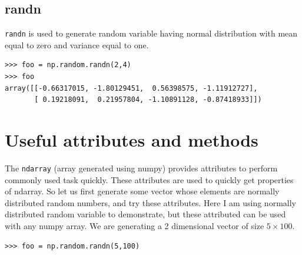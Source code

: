 \documentclass[10pt]{book}
\begin{document}
{\subsection{randn}
\verb"randn" is used to generate random variable having normal distribution with mean equal to zero and variance equal to one.

\beforeverb
\begin{verbatim}
>>> foo = np.random.randn(2,4)
>>> foo
array([[-0.66317015, -1.80129451,  0.56398575, -1.11912727],
       [ 0.19218091,  0.21957804, -1.10891128, -0.87418933]])
\end{verbatim}
\afterverb

\section{Useful attributes and methods}
The \verb"ndarray" (array generated using numpy) provides attributes to perform commonly used task quickly. These attributes are used to quickly get  properties of ndarray. So let us first generate some vector whose elements are normally distributed random numbers, and try these attributes. Here I am using normally distributed random variable to demonstrate, but these attributed can be used with any numpy array. We are generating a 2 dimensional vector of size $5 \times 100$.
\beforeverb \begin{verbatim}
>>> foo = np.random.randn(5,100)
\end{verbatim} \afterverb

}
\end{document}
